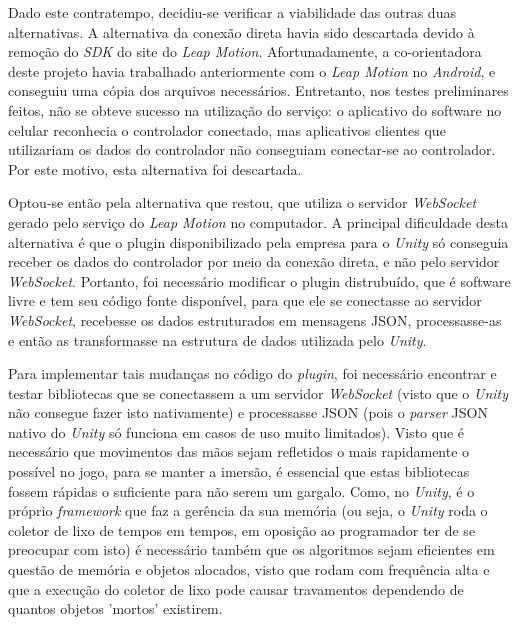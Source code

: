 Dado este contratempo, decidiu-se verificar a viabilidade das outras duas 
alternativas. A alternativa da conexão direta havia sido descartada devido
à remoção do \textit{SDK} do site do \textit{Leap Motion}. 
Afortunadamente, a co-orientadora 
deste projeto havia trabalhado anteriormente com o \textit{Leap Motion} 
no \textit{Android}, e conseguiu uma cópia dos arquivos necessários. 
Entretanto, nos testes preliminares feitos, não se obteve sucesso na 
utilização do serviço: o aplicativo do software no celular reconhecia o 
controlador conectado, mas aplicativos clientes que utilizariam os 
dados do controlador não conseguiam conectar-se ao controlador. Por este 
motivo, esta alternativa foi descartada.

Optou-se então pela alternativa que restou, que utiliza o servidor
\textit{WebSocket} gerado pelo serviço do \textit{Leap Motion} no computador. 
A principal dificuldade desta alternativa é que o plugin disponibilizado 
pela empresa para o \textit{Unity} só conseguia receber os dados do controlador 
por meio da conexão direta, e não pelo servidor \textit{WebSocket}. Portanto, foi 
necessário modificar o plugin distrubuído, que é software livre e tem seu 
código fonte disponível, para que ele se conectasse ao servidor \textit{WebSocket}, 
recebesse os dados estruturados em mensagens JSON, processasse-as e 
então as transformasse na estrutura de dados utilizada pelo \textit{Unity}.

Para implementar tais mudanças no código do \textit{plugin}, foi necessário encontrar 
e testar bibliotecas que se conectassem a um servidor
\textit{WebSocket} (visto que o \textit{Unity} não consegue fazer 
isto nativamente) e processasse JSON (pois o \textit{parser} JSON nativo 
do \textit{Unity} só funciona em casos de uso muito limitados). Visto que 
é necessário que movimentos das mãos sejam refletidos o mais rapidamente 
o possível no jogo, para se manter a imersão, é essencial que 
estas bibliotecas fossem rápidas o suficiente para não serem um gargalo. 
Como, no \textit{Unity}, é o próprio \textit{framework}
que faz a gerência da sua memória (ou seja, o \textit{Unity} roda o coletor de 
lixo de tempos em tempos, em oposição ao programador ter de se preocupar com isto)
é necessário também que os algoritmos sejam eficientes em questão de memória 
e objetos alocados, visto que rodam com frequência alta e que a execução do
coletor de lixo pode causar travamentos dependendo de quantos objetos 'mortos' 
existirem.

